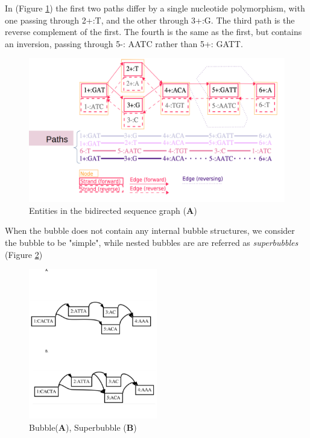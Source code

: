 In (Figure \ref{fig:gfa.png}) the first two paths differ by a single nucleotide polymorphism, with one passing through 2+:T, and the other through 3+:G. The third path is the reverse complement of the first. The fourth is the same as the first, but contains an inversion, passing through 5-: AATC rather than 5+: GATT.



\begin{figure}[H]
\centering
\includegraphics[width=1.00\textwidth]{fig/GFA.png}
\decoRule
\caption{Entities in the bidirected sequence graph (\textbf{A}) \cite{eizenga2020succinct}}
\label{fig:gfa.png}
\end{figure}

When the bubble does not contain any internal bubble structures, we consider the bubble to be "simple", while nested bubbles are are referred as \textit{superbubbles} (Figure \ref{fig:sup_bub.png})

\begin{figure}[H]
\centering
\includegraphics[width=0.50\textwidth]{fig/bub_sup.png}
\decoRule
\caption{Bubble(\textbf{A}), Superbubble (\textbf{B})}
\label{fig:sup_bub.png}
\end{figure}


